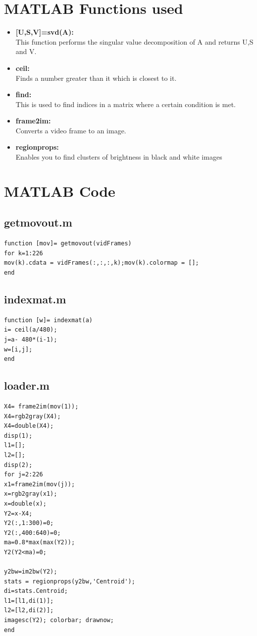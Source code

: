\documentclass[a4paper]{article}
\begin{document}
\section{MATLAB Functions used}
\begin{itemize}
\item \textbf{[U,S,V]=svd(A): } \\ This function performs the singular value decomposition of A and returns U,S and V.
\item \textbf{ceil: } \\ Finds a number greater than it which is closest to it.
\item \textbf{find: } \\ This is used to find indices in a matrix where a certain condition is met.
\item \textbf{frame2im: } \\ Converts a video frame to an image.
\item \textbf{regionprops: } \\ Enables you to find clusters of brightness in black and white images
\end{itemize}

\section{MATLAB Code}
\subsection{getmovout.m}
\begin{lstlisting}[style=myMatlabstyle]
function [mov]= getmovout(vidFrames)
for k=1:226
mov(k).cdata = vidFrames(:,:,:,k);mov(k).colormap = [];
end
\end{lstlisting}
\subsection{indexmat.m}
\begin{lstlisting}[style=myMatlabstyle]
function [w]= indexmat(a)
i= ceil(a/480);
j=a- 480*(i-1);
w=[i,j];
end
\end{lstlisting}
\subsection{loader.m}
\begin{lstlisting}[style=myMatlabstyle]
X4= frame2im(mov(1));
X4=rgb2gray(X4);
X4=double(X4);
disp(1);
l1=[];
l2=[];
disp(2);
for j=2:226
x1=frame2im(mov(j));
x=rgb2gray(x1);
x=double(x);
Y2=x-X4;
Y2(:,1:300)=0;
Y2(:,400:640)=0;
ma=0.8*max(max(Y2));
Y2(Y2<ma)=0;

y2bw=im2bw(Y2);
stats = regionprops(y2bw,'Centroid');
di=stats.Centroid;
l1=[l1,di(1)];
l2=[l2,di(2)];
imagesc(Y2); colorbar; drawnow;
end
\end{lstlisting}
\end{document}
